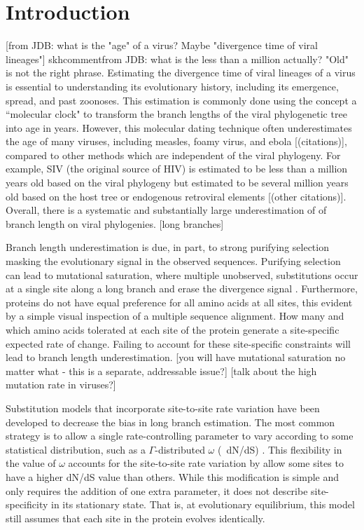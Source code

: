 \documentclass[11pt]{article}
\newcommand\skhcomment[1]{{\color{cyan}[#1]}}
\begin{document}
\section*{Introduction} 
\skhcomment{from JDB: what is the "age" of a virus? Maybe "divergence time of viral lineages"}
skhcomment{from JDB: what is the less than a million actually? "Old" is not the right phrase.}
Estimating the divergence time of viral lineages of a virus is essential to understanding its evolutionary history, including its emergence, spread, and past zoonoses. 
This estimation is commonly done using the concept a ``molecular clock" to transform the branch lengths of the viral phylogenetic tree into age in years. 
However, this molecular dating technique often underestimates the age of many viruses, including measles, foamy virus, and ebola \skhcomment{(citations)}, compared to other methods which are independent of the viral phylogeny. 
For example, SIV (the original source of HIV) is estimated to be less than a million years old based on the viral phylogeny \citep{sharp2000origins,wertheim2009dating,worobey2010island} but estimated to be several million years old based on the host tree or endogenous retroviral elements  \citep{compton2013host} \skhcomment{(other citations)}. 
Overall, there is a systematic and substantially large underestimation of of branch length on viral phylogenies. 
\skhcomment{long branches}

Branch length underestimation is due, in part, to strong purifying selection masking the evolutionary signal in the observed sequences. 
Purifying selection can lead to mutational saturation, where multiple unobserved, substitutions occur at a single site along a long branch and erase the divergence signal \citep{holmes2003molecular}.
Furthermore, proteins do not have equal preference for all amino acids at all sites, this evident by a simple visual inspection of a multiple sequence alignment. 
How many and which amino acids tolerated at each site of the protein generate a site-specific expected rate of change. 
Failing to account for these site-specific constraints will lead to branch length underestimation. 
\skhcomment{you will have mutational saturation no matter what - this is a separate, addressable issue?}
\skhcomment{talk about the high mutation rate in viruses?}

Substitution models that incorporate site-to-site rate variation have been developed to decrease the bias in long branch estimation. 
The most common strategy is to allow a single rate-controlling parameter to vary according to some statistical distribution, such as a $\Gamma$-distributed $\omega$ (~dN/dS) \citep{yang2000codon}. 
This flexibility in the value of $\omega$ accounts for the site-to-site rate variation by allow some sites to have a higher dN/dS value than others. 
While this modification is simple and only requires the addition of one extra parameter, it does not describe site-specificity in its stationary state. 
That is, at evolutionary equilibrium, this model still assumes that each site in the protein evolves identically.  
\end{document}
